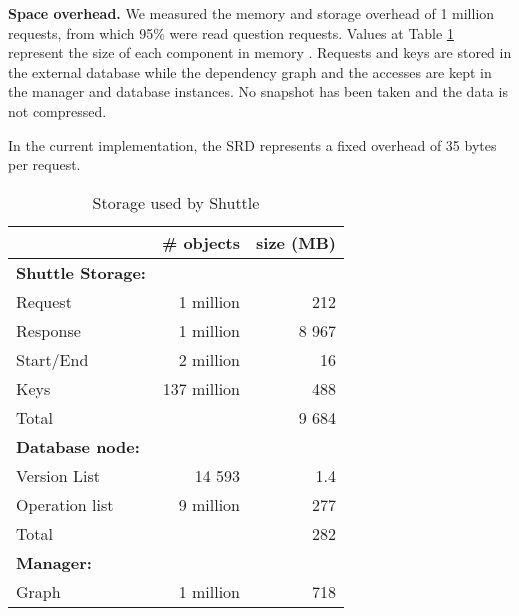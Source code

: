 \textbf{Space overhead.}
We measured the memory and storage overhead of 1 million requests, from which 95\% were read question requests. Values at Table \ref{tab:storage_overhead} represent the size of each component in memory . Requests and keys are stored in the external database while the dependency graph and the accesses are kept in the manager and database instances. No snapshot has been taken and the data is not compressed.

In the current implementation, the \ac{SRD} represents a fixed overhead of 35 bytes per request.
\begin{table}[h]
\centering
\footnotesize
  \begin{tabular}{l|rr}
                & \# objects & size (MB) \\ \hline
  \textbf{Shuttle Storage: }      \\
  Request         & 1 million    & 212       \\  %
  Response        & 1 million    & 8 967     \\  %
  Start/End       & 2 million    & 16        \\  %
  Keys            & 137 million  & 488       \\  %
  Total           &              & 9 684     \\  %
  \textbf{Database node:}        &           \\
  Version List    &  14 593      &  1.4       \\ %
  Operation list  &  9 million   &  277       \\ %
  Total           &              & 282 \\ %
  \textbf{Manager:} & & \\ 
  Graph           & 1 million    & 718 \\  %
  \end{tabular}            
\caption{Storage used by Shuttle}
\label{tab:storage_overhead}
\vspace{-5mm}
\end{table}

